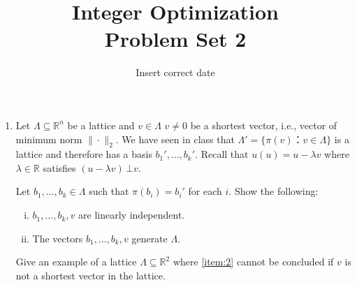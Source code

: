 \documentclass[11pt,a4paper]{article}
\title{Integer Optimization  \\ Problem Set 2 }
\date{ Insert correct date}
\begin{document}
\maketitle 




\begin{enumerate} 
\item

  Let $Λ ⊆ ℝ^n$ be a lattice and $v ∈ Λ$  $ v ≠0$ be a shortest vector, i.e., vector of minimum norm $\| ⋅ \|_2$. We have seen in class that $Λ' = \{π(v) ： v ∈ Λ\}$ is a lattice and therefore has a basis $b_1',\dots,b_k'$. Recall that $u(u) = u - λ v$ where $λ ∈ ℝ$ satisfies $(u - λ v ) \, ⊥ v$.

  Let $b_1,\dots,b_k ∈ Λ$ such that $π(b_i) = b_i'$ for each $i$. Show the following:

  \begin{enumerate}[i)] 
  \item $b_1,\dots,b_k,v$ are linearly independent. \label{item:1}
  \item The vectors $b_1,\dots,b_k,v$ generate $Λ$. \label{item:2}
  \end{enumerate}

Give an example of a lattice $Λ ⊆ ℝ^2$ where \ref{item:2} cannot be concluded if $v$ is not a shortest vector in the lattice. 
 

  

\end{enumerate}



%
%


 
\end{document}

